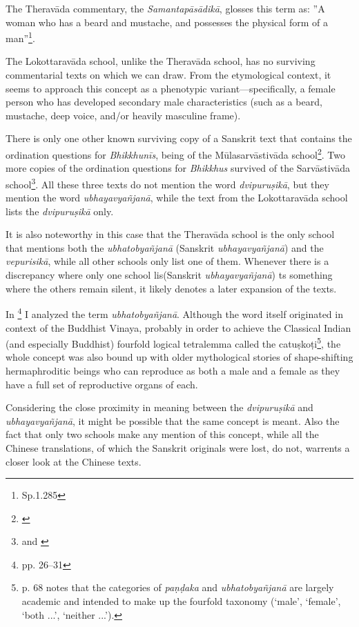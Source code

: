 The Theravāda commentary, the \textit{Samantapāsādikā}, glosses this term as: ''A  woman who has a beard and mustache, and possesses the physical form of a man''\footnote{Sp.1.285}.

The Lokottaravāda school, unlike the Theravāda school, has no surviving commentarial texts on which we can draw. From the etymological context, it seems to approach this concept as a phenotypic variant—specifically, a female person who has developed secondary male characteristics (such as a beard, mustache, deep voice, and/or heavily masculine frame).

There is only one other known surviving copy of a Sanskrit text that contains the ordination questions for \textit{Bhikkhunīs}, being of the Mūlasarvāstivāda school\footnote{\cite{schmidt}}. Two more copies of the ordination questions for \textit{Bhikkhus} survived of the Sarvāstivāda school\footnote{\cite{haertel1956} and \cite{chung2004}}. All these three texts do not mention the word \textit{dvipuruṣikā}, but they mention the word \textit{ubhayavyañjanā}, while the text from the Lokottaravāda school lists the \textit{dvipuruṣikā} only. 

It is also noteworthy in this case that the Theravāda school is the only school that mentions both the \textit{ubhatobyañjanā} (Sanskrit \textit{ubhayavyañjanā}) and the \textit{vepurisikā}, while all other schools only list one of them. Whenever there is a discrepancy where only one school lis(Sanskrit \textit{ubhayavyañjanā}) ts something where the others remain silent, it likely denotes a later expansion of the texts. 

In \cite{vimala2021}\footnote{\cite{vimala2021} pp. 26--31} I analyzed the term \textit{ubhatobyañjanā}. Although the word itself originated in context of the Buddhist Vinaya, probably in order to achieve the
Classical Indian (and especially Buddhist) fourfold logical tetralemma called the catuṣkoṭi\footnote{\cite{scherer} p. 68 notes that
the categories of \textit{paṇḍaka} and \textit{ubhatobyañjanā} are largely academic and intended to make up the fourfold taxonomy (‘male’, ‘female’, ‘both ...’, ‘neither ...’).}, the whole concept was also bound up with older mythological stories of shape-shifting hermaphroditic beings who can reproduce as both a male and a female as they have a full set of reproductive organs of each.

Considering the close proximity in meaning between the \textit{dvipuruṣikā} and \textit{ubhayavyañjanā}, it might be possible that the same concept is meant. Also the fact that only two schools make any mention of this concept, while all the Chinese translations, of which the Sanskrit originals were lost, do not, warrents a closer look at the Chinese texts.

